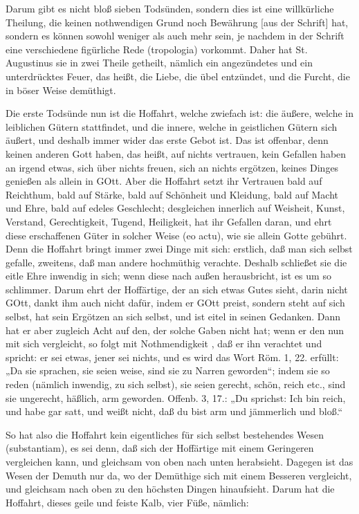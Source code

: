 Darum gibt es nicht bloß sieben Todsünden, sondern dies ist eine willkürliche Theilung, die keinen nothwendigen Grund noch Bewährung [aus der Schrift] hat, sondern es können sowohl weniger als auch mehr sein, je nachdem in der Schrift eine verschiedene figürliche Rede (tropologia) vorkommt. Daher hat St. Augustinus sie in zwei Theile getheilt, nämlich ein angezündetes und ein unterdrücktes Feuer, das heißt, die Liebe, die übel entzündet, und die Furcht, die in böser Weise demüthigt.

Die erste Todsünde nun ist die Hoffahrt, welche zwiefach ist: die äußere, welche in leiblichen Gütern stattfindet, und die innere, welche in geistlichen Gütern sich äußert, und deshalb immer wider das erste Gebot ist. Das ist offenbar, denn keinen anderen Gott haben, das heißt, auf nichts vertrauen, kein Gefallen haben an irgend etwas, sich über nichts freuen, sich an nichts ergötzen, keines Dinges genießen als allein in GOtt. Aber die Hoffahrt setzt ihr Vertrauen bald auf Reichthum, bald auf Stärke, bald auf Schönheit und Kleidung, bald auf Macht und Ehre, bald auf edeles Geschlecht; desgleichen innerlich auf Weisheit, Kunst, Verstand, Gerechtigkeit, Tugend, Heiligkeit, hat ihr Gefallen daran, und ehrt diese erschaffenen Güter in solcher Weise (eo actu), wie sie allein Gotte gebührt. Denn die Hoffahrt bringt immer zwei Dinge mit sich: erstlich, daß man sich selbst gefalle, zweitens, daß man andere hochmüthig verachte. Deshalb schließet sie die eitle Ehre inwendig in sich; wenn diese nach außen herausbricht, ist es um so schlimmer. Darum ehrt der Hoffärtige, der an sich etwas Gutes sieht, darin nicht GOtt, dankt ihm auch nicht dafür, indem er GOtt preist, sondern steht auf sich selbst, hat sein Ergötzen an sich selbst, und ist eitel in seinen Gedanken. Dann hat er aber zugleich Acht auf den, der solche Gaben nicht hat; wenn er den nun mit sich vergleicht, so folgt mit Nothmendigkeit
, daß er ihn verachtet und spricht: er sei etwas, jener sei nichts, und es wird das Wort Röm. 1, 22. erfüllt: „Da sie sprachen, sie seien weise, sind sie zu Narren geworden“; indem sie so reden (nämlich inwendig, zu sich selbst), sie seien gerecht, schön, reich etc., sind sie ungerecht, häßlich, arm geworden. Offenb. 3, 17.: „Du sprichst: Ich bin reich, und habe gar satt, und weißt nicht, daß du bist arm und jämmerlich und bloß.“

So hat also die Hoffahrt kein eigentliches für sich selbst bestehendes Wesen (substantiam), es sei denn, daß sich der Hoffärtige mit einem Geringeren vergleichen kann, und gleichsam von oben nach unten herabsieht. Dagegen ist das Wesen der Demuth nur da, wo der Demüthige sich mit einem Besseren vergleicht, und gleichsam nach oben zu den höchsten Dingen hinaufsieht. Darum hat die Hoffahrt, dieses geile und feiste Kalb, vier Füße, nämlich:

